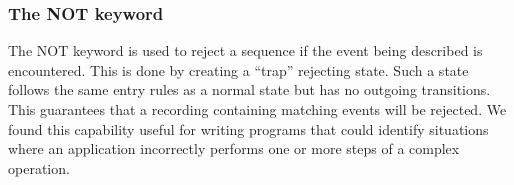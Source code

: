 \subsubsection{The NOT keyword}
\label{subsub:NOT}

The NOT keyword is used to reject a sequence if the event being
described is encountered.  This is done by creating a ``trap''
rejecting state.  Such a state follows the same entry rules
as a normal state but has no outgoing transitions.  This guarantees that a
recording containing matching events will be rejected.
We found this capability useful for writing programs that could identify
situations where an application incorrectly performs one or more steps of a
complex operation.





